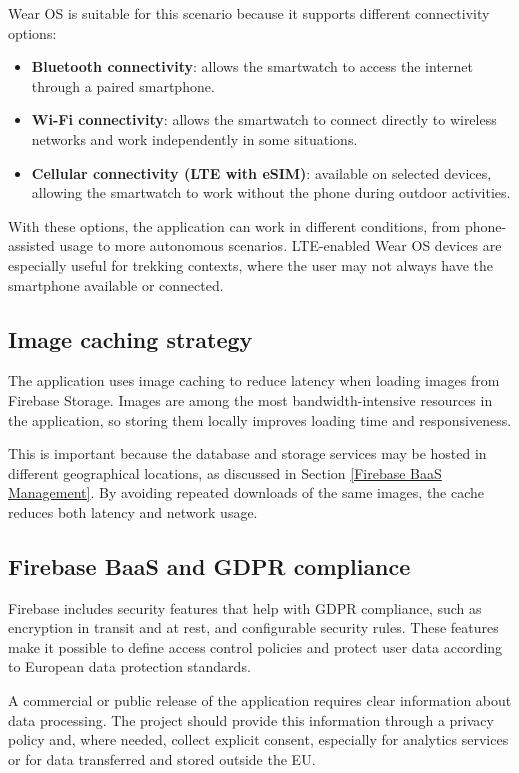 Wear OS is suitable for this scenario because it supports different connectivity options:
\begin{itemize}
\item \textbf{Bluetooth connectivity}: allows the smartwatch to access the internet through a paired smartphone.
\item \textbf{Wi-Fi connectivity}: allows the smartwatch to connect directly to wireless networks and work independently in some situations.
\item \textbf{Cellular connectivity (LTE with eSIM)}: available on selected devices, allowing the smartwatch to work without the phone during outdoor activities.
\end{itemize}

With these options, the application can work in different conditions, from phone-assisted usage to more autonomous scenarios. LTE-enabled Wear OS devices are especially useful for trekking contexts, where the user may not always have the smartphone available or connected.

\subsection{Image caching strategy}
\label{Image cache design decision}
The application uses image caching to reduce latency when loading images from Firebase Storage. Images are among the most bandwidth-intensive resources in the application, so storing them locally improves loading time and responsiveness.

This is important because the database and storage services may be hosted in different geographical locations, as discussed in Section \ref{Firebase BaaS Management}. By avoiding repeated downloads of the same images, the cache reduces both latency and network usage.

\subsection{Firebase BaaS and GDPR compliance}
Firebase includes security features that help with GDPR compliance, such as encryption in transit and at rest, and configurable security rules. These features make it possible to define access control policies and protect user data according to European data protection standards.

A commercial or public release of the application requires clear information about data processing. The project should provide this information through a privacy policy and, where needed, collect explicit consent, especially for analytics services or for data transferred and stored outside the EU.



